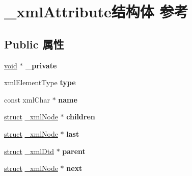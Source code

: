 \hypertarget{struct__xml_attribute}{}\section{\+\_\+xml\+Attribute结构体 参考}
\label{struct__xml_attribute}
\subsection*{Public 属性}
\begin{DoxyCompactItemize}
\item 
\mbox{\label{struct__xml_attribute_a3db7f8ae253ee907711d1377ef688bc0}} 
\hyperlink{interfacevoid}{void} $\ast$ {\bfseries \+\_\+private}
\item 
\mbox{\label{struct__xml_attribute_af3ca1a0e47ae810fbb710a8f07ea70cc}} 
xml\+Element\+Type {\bfseries type}
\item 
\mbox{\label{struct__xml_attribute_a35a0be8bbf112f3409ab47a45f2a33af}} 
const xml\+Char $\ast$ {\bfseries name}
\item 
\mbox{\label{struct__xml_attribute_ab523ec1bd56b4f5c1867890ec6098e8f}} 
\hyperlink{interfacestruct}{struct} \hyperlink{struct__xml_node}{\+\_\+xml\+Node} $\ast$ {\bfseries children}
\item 
\mbox{\label{struct__xml_attribute_ae3ef54ca4afda8aea53163857d2685bf}} 
\hyperlink{interfacestruct}{struct} \hyperlink{struct__xml_node}{\+\_\+xml\+Node} $\ast$ {\bfseries last}
\item 
\mbox{\label{struct__xml_attribute_acf4b2fe0cbc2f1d4cbc839f23231fd24}} 
\hyperlink{interfacestruct}{struct} \hyperlink{struct__xml_dtd}{\+\_\+xml\+Dtd} $\ast$ {\bfseries parent}
\item 
\mbox{\label{struct__xml_attribute_aaf451d7856b880bbf981889eae9c2828}} 
\hyperlink{interfacestruct}{struct} \hyperlink{struct__xml_node}{\+\_\+xml\+Node} $\ast$ {\bfseries next}
\item 
\mbox{\label{struct__xml_attribute_a7c8303adaaafa913f726f7fd557fc480}} 

\end{DoxyCompactItemize}
